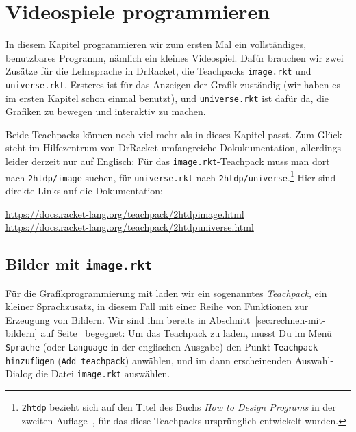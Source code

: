 
\chapter{Videospiele programmieren}
\label{cha:representation-and-state}

In diesem Kapitel programmieren wir zum ersten Mal ein vollständiges,
benutzbares Programm, nämlich ein kleines Videospiel.  Dafür brauchen
wir zwei Zusätze für die Lehrsprache in DrRacket, die Teachpacks
\texttt{image.rkt} und \texttt{universe.rkt}.  Ersteres ist für das
Anzeigen der Grafik zuständig (wir haben es im ersten Kapitel schon
einmal benutzt), und \texttt{universe.rkt} ist dafür da, die Grafiken
zu bewegen und interaktiv zu machen.

Beide Teachpacks können noch viel mehr als in dieses Kapitel passt.
Zum Glück steht im Hilfezentrum von DrRacket umfangreiche
Dokukumentation, allerdings leider derzeit nur auf Englisch: Für das
\texttt{image.rkt}-Teachpack muss man dort nach \texttt{2htdp/image}
suchen, für \texttt{universe.rkt} nach
\texttt{2htdp/universe}.\footnote{\texttt{2htdp} bezieht sich auf den
  Titel des Buchs \textit{How to Design Programs} in der zweiten
  Auflage~\cite{FelleisenFindlerFlattKrishnamurthi2001}, für das diese
Teachpacks ursprünglich entwickelt wurden.}  Hier sind direkte Links
auf die Dokumentation:
%
\begin{flushleft}
\url{https://docs.racket-lang.org/teachpack/2htdpimage.html}\\
\url{https://docs.racket-lang.org/teachpack/2htdpuniverse.html}
\end{flushleft}

\section{Bilder mit \texttt{image.rkt}}

Für die Grafikprogrammierung mit \drscheme{} laden wir ein sogenanntes
\textit{Teachpack}, ein kleiner Sprachzusatz, in
diesem Fall mit einer Reihe von Funktionen zur Erzeugung von Bildern.
Wir sind ihm bereits in Abschnitt~\ref{sec:rechnen-mit-bildern} auf
Seite~\pageref{sec:rechnen-mit-bildern} begegnet: Um das Teachpack zu
laden, musst Du im Menü \texttt{Sprache} (oder \texttt{Language} in
der englischen Ausgabe) den Punkt \texttt{Teachpack hinzufügen}
(\texttt{Add teachpack}) anwählen, und im dann erscheinenden
Auswahl-Dialog die Datei
\texttt{image.rkt} auswählen.


